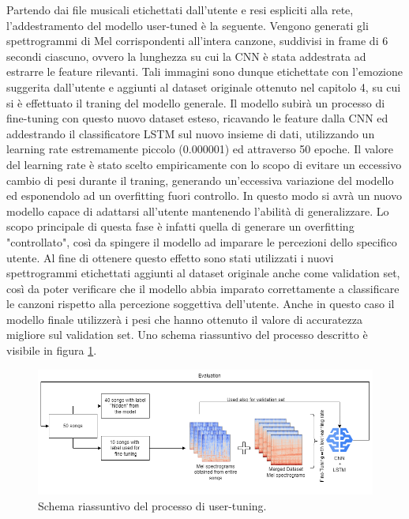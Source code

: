 \documentclass[11pt]{report}
\begin{document}
Partendo dai file musicali etichettati dall'utente e resi espliciti alla rete, l'addestramento del modello user-tuned è la seguente. Vengono generati gli spettrogrammi di Mel corrispondenti all'intera canzone, suddivisi in frame di 6 secondi ciascuno, ovvero la lunghezza su cui la CNN è stata addestrata ad estrarre le feature rilevanti. Tali immagini sono dunque etichettate con l'emozione suggerita dall'utente e aggiunti al dataset originale ottenuto nel capitolo 4, su cui si è effettuato il traning del modello generale. Il modello subirà un processo di fine-tuning con questo nuovo dataset esteso, ricavando le feature dalla CNN ed addestrando il classificatore LSTM sul nuovo insieme di dati, utilizzando un learning rate estremamente piccolo (0.000001) ed attraverso 50 epoche. Il valore del learning rate è stato scelto empiricamente con lo scopo di evitare un eccessivo cambio di pesi durante il traning, generando un'eccessiva variazione del modello ed esponendolo ad un overfitting fuori controllo. In questo modo si avrà un nuovo modello capace di adattarsi all'utente mantenendo l'abilità di generalizzare. Lo scopo principale di questa fase è infatti quella di generare un overfitting "controllato", così da spingere il modello ad imparare le percezioni dello specifico utente. Al fine di ottenere questo effetto sono stati utilizzati i nuovi spettrogrammi etichettati aggiunti al dataset originale anche come validation set, così da poter verificare che il modello abbia imparato correttamente a classificare le canzoni rispetto alla percezione soggettiva dell'utente. Anche in questo caso il modello finale utilizzerà i pesi che hanno ottenuto il valore di accuratezza migliore sul validation set. Uno schema riassuntivo del processo descritto è visibile in figura \ref{fig:summary-user-tuning}.

\vspace{1cm}

\begin{figure}[h]
\centering
\includegraphics[scale = 0.55]{img/finetuning-process.png}
\caption{Schema riassuntivo del processo di user-tuning.}
\label{fig:summary-user-tuning}
\end{figure}
\end{document}
